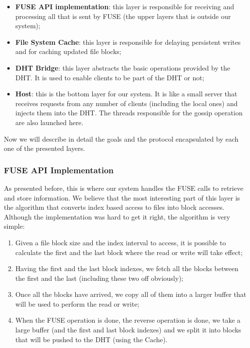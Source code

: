 \documentclass[times,9pt,article]{llncs}
\begin{document}
\begin{itemize}
\item \textbf{FUSE API implementation}: this layer is responsible for receiving and processing all that is sent by FUSE (the upper layers that is outside our system);
\item \textbf{File System Cache}: this layer is responsible for delaying persistent writes and for caching updated file blocks;
\item \textbf{DHT Bridge}: this layer abstracts the basic operations provided by the DHT. It is used to enable clients to be part of the DHT or not;
\item \textbf{Host}: this is the bottom layer for our system. It is like a small server that receives requests from any number of clients (including the local ones) and injects them into the DHT. The threads responsible for the gossip operation are also launched here.
\end{itemize}

Now we will describe in detail the goals and the protocol encapsulated by each one of the presented layers.

\subsubsection{FUSE API Implementation}

As presented before, this is where our system handles the FUSE calls to retrieve and store information. We believe that the most interesting part of this layer is the algorithm that converts index based access to files into block accesses. Although the implementation was hard to get it right, the algorithm is very simple:

\begin{enumerate}
\item Given a file block size and the index interval to access, it is possible to calculate the first and the last block where the read or write will take effect;
\item Having the first and the last block indexes, we fetch all the blocks between the first and the last (including these two off obviously);
\item Once all the blocks have arrived, we copy all of them into a larger buffer that will be used to perform the read or write;
\item When the FUSE operation is done, the reverse operation is done, we take a large buffer (and the first and last block indexes) and we split it into blocks that will be pushed to the DHT (using the Cache).
\end{enumerate}
\end{document}
